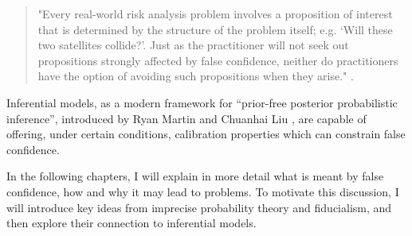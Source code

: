 \documentclass[
]{report}
\theoremstyle{definition}
\theoremstyle{definition}
\begin{document}
\begin{quote}
"Every real-world risk analysis problem involves a proposition of interest that is determined by
the structure of the problem itself; e.g. ‘Will these two satellites collide?’. Just as the practitioner will not seek out propositions strongly affected by false confidence, neither do practitioners have the option of avoiding such propositions when they arise." \cite{balch_satellite_2019}.
\end{quote}

Inferential models, as a modern framework for ``prior-free posterior
probabilistic inference'', introduced by Ryan Martin and Chuanhai Liu
\cite{martin_inferential_2013}, are capable of offering, under certain
conditions, calibration properties which can constrain false confidence.

In the following chapters, I will explain in more detail what is meant
by false confidence, how and why it may lead to problems. To motivate
this discussion, I will introduce key ideas from imprecise probability
theory and fiducialism, and then explore their connection to inferential
models.
\end{document}

